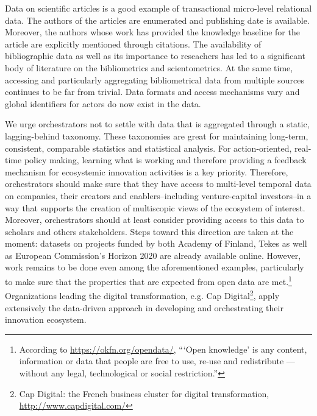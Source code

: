Data on scientific articles is a good example of transactional micro-level relational data. The authors of the articles are enumerated and publishing date is available. Moreover, the authors whose work has provided the knowledge baseline for the article are explicitly mentioned through citations. The availability of bibliographic data as well as its  importance to reseachers has led to a significant body of literature on the bibliometrics and scientometrics. At the same time, accessing and particularly aggregating bibliometrical data from multiple sources continues to be far from trivial. Data formats and access mechanisms vary and global identifiers for actors do now exist in the data.

We urge orchestrators not to settle with data that is aggregated through a static, lagging-behind taxonomy. These taxonomies are great for maintaining long-term, consistent, comparable statistics and statistical analysis. For action-oriented, real-time policy making, learning what is working and therefore providing a feedback mechanism for ecosystemic innovation activities is a key priority. Therefore, orchestrators should make sure that they have access to multi-level temporal data on companies, their creators and enablers--including venture-capital investors--in a way that supports the creation of multiscopic views of the ecosystem of interest. Moreover, orchestrators should at least consider providing access to this data to scholars and others stakeholders. Steps toward this direction are taken at the moment: datasets on projects funded by both Academy of Finland, Tekes as well as European Commission's Horizon 2020 are already available online. However, work remains to be done even among the aforementioned examples, particularly to make sure that the properties that are expected from open data are met.\footnote{According to \href{Open Knowledge}{https://okfn.org/opendata/}, ``‘Open knowledge’ is any content, information or data that people are free to use, re-use and redistribute — without any legal, technological or social restriction.''} Organizations leading the digital transformation, e.g. Cap Digital\footnote{Cap Digital: the French business cluster for digital transformation, \url{http://www.capdigital.com/}}, apply extensively the data-driven approach in developing and orchestrating their innovation ecosystem.

